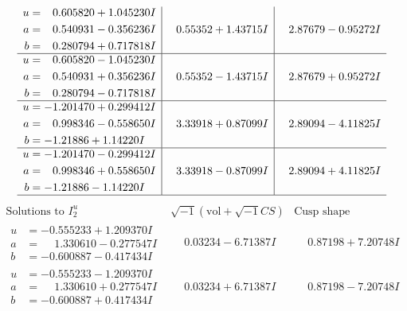 \documentclass[1p]{elsarticle_modified}
\theoremstyle{definition}
\newcommand{\I}{\sqrt{-1}}
\begin{document}
$$\begin{array}{c|c|c}
\begin{aligned}
u &= \phantom{-}0.605820 + 1.045230 I \\
a &= \phantom{-}0.540931 - 0.356236 I \\
b &= \phantom{-}0.280794 + 0.717818 I\end{aligned}
 & \phantom{-}0.55352 + 1.43715 I & \phantom{-}2.87679 - 0.95272 I \\ \hline\begin{aligned}
u &= \phantom{-}0.605820 - 1.045230 I \\
a &= \phantom{-}0.540931 + 0.356236 I \\
b &= \phantom{-}0.280794 - 0.717818 I\end{aligned}
 & \phantom{-}0.55352 - 1.43715 I & \phantom{-}2.87679 + 0.95272 I \\ \hline\begin{aligned}
u &= -1.201470 + 0.299412 I \\
a &= \phantom{-}0.998346 - 0.558650 I \\
b &= -1.21886 + 1.14220 I\end{aligned}
 & \phantom{-}3.33918 + 0.87099 I & \phantom{-}2.89094 - 4.11825 I \\ \hline\begin{aligned}
u &= -1.201470 - 0.299412 I \\
a &= \phantom{-}0.998346 + 0.558650 I \\
b &= -1.21886 - 1.14220 I\end{aligned}
 & \phantom{-}3.33918 - 0.87099 I & \phantom{-}2.89094 + 4.11825 I\\
 \hline 
 \end{array}$$\newpage$$\begin{array}{c|c|c}  
\text{Solutions to }I^u_{2}& \I (\text{vol} + \sqrt{-1}CS) & \text{Cusp shape}\\
 \hline 
\begin{aligned}
u &= -0.555233 + 1.209370 I \\
a &= \phantom{-}1.330610 - 0.277547 I \\
b &= -0.600887 - 0.417434 I\end{aligned}
 & \phantom{-}0.03234 - 6.71387 I & \phantom{-}0.87198 + 7.20748 I \\ \hline\begin{aligned}
u &= -0.555233 - 1.209370 I \\
a &= \phantom{-}1.330610 + 0.277547 I \\
b &= -0.600887 + 0.417434 I\end{aligned}
 & \phantom{-}0.03234 + 6.71387 I & \phantom{-}0.87198 - 7.20748 I \\ \hline\begin{aligned}

\end{aligned}
\end{array}$$
\end{document}
